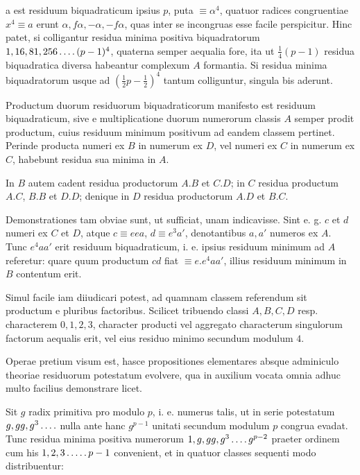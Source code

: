 %
a est residuum biquadraticum ipsius $p$, puta $\equiv\alpha^4$, quatuor radices congruentiae $x^4\equiv a$ erunt $\alpha,f\alpha,-\alpha,-f\alpha$, quas inter se incongruas esse facile perspicitur. Hinc patet, si colligantur residua minima positiva biquadratorum $1,16,81,256\mathinner{.\,.\,.\,.}(p-1)^4$, quaterna semper aequalia fore, ita ut $\tfrac14(p-1)$ residua biquadratica diversa habeantur complexum $A$ formantia. Si residua minima biquadratorum usque ad $(\tfrac12p-\tfrac12)^4$ tantum colliguntur, singula bis aderunt.

Productum duorum residuorum biquadraticorum manifesto est residuum biquadraticum, sive e multiplicatione duorum numerorum classis $A$ semper prodit productum, cuius residuum minimum positivum ad eandem classem pertinet. Perinde producta numeri ex $B$ in numerum ex $D$, vel numeri ex $C$ in numerum ex $C$, habebunt residua sua minima in $A$.

In $B$ autem cadent residua productorum $A.B$ et $C.D$; in $C$ residua productum $A.C$, $B.B$ et $D.D$; denique in $D$ residua productorum $A.D$ et $B.C$.

Demonstrationes tam obviae sunt, ut sufficiat, unam indicavisse. Sint e. g. $c$ et $d$ numeri ex $C$ et $D$, atque $c\equiv eea$, $d\equiv e^3a'$, denotantibus $a,a'$ numeros ex $A$. Tunc $e^4aa'$ erit residuum biquadraticum, i. e. ipsius residuum minimum ad $A$ referetur: quare quum productum $cd$ fiat $\equiv e.e^4aa'$, illius residuum minimum in $B$ contentum erit.

Simul facile iam diiudicari potest, ad quamnam classem referendum sit productum e pluribus factoribus. Scilicet tribuendo classi $A,B,C,D$ resp. characterem $0,1,2,3$, character producti vel aggregato characterum singulorum factorum aequalis erit, vel eius residuo minimo secundum modulum $4$.

Operae pretium visum est, hasce propositiones elementares absque adminiculo theoriae residuorum potestatum evolvere, qua in auxilium vocata omnia adhuc multo facilius demonstrare licet.

Sit $g$ radix primitiva pro modulo $p$, i. e. numerus talis, ut in serie potestatum $g,gg,g^3\mathinner{.\,.\,.\,.}$ nulla ante hanc $g^{p-1}$ unitati secundum modulum $p$ congrua evadat. Tunc residua minima positiva numerorum $1,g,gg,g^3\mathinner{.\,.\,.\,.} g^{p-2}$ praeter ordinem cum his $1,2,3\mathinner{.\,.\,.\,.\,.} p-1$ convenient, et in quatuor classes sequenti modo distribuentur:

